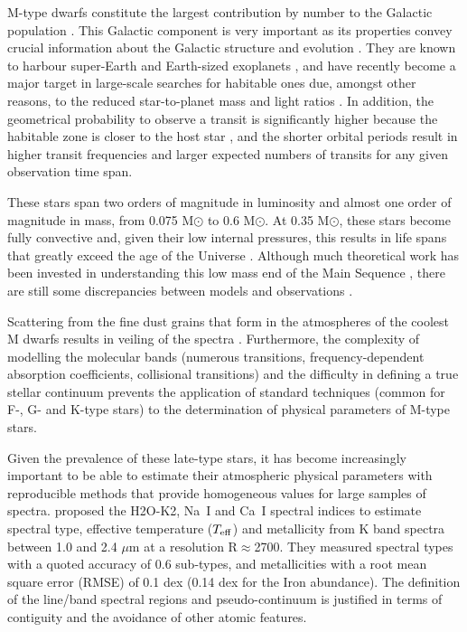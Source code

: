 
M-type dwarfs constitute the largest contribution by number to the
Galactic population \citep{2010AJ....139.2679B}. This Galactic
component is very important as its properties convey crucial
information about the Galactic structure and
evolution \citep{2013A&A...556A.110B}. They are known to harbour
super-Earth \citep{2013A&A...556A.110B} and Earth-sized
exoplanets \citep{2015ApJ...807...45D}, and have recently become a
major target in large-scale searches for habitable ones due, amongst
other reasons, to the reduced star-to-planet mass and light
ratios \citep{2015A&A...577A.128A}. In addition, the geometrical
probability to observe a transit is significantly higher because the
habitable zone is closer to the host star \citep{Shields20161}, and
the shorter orbital periods result in higher transit frequencies and
larger expected numbers of transits for any given observation time
span.

These stars span two orders of magnitude in luminosity and almost one
order of magnitude in mass, from 0.075 M$\odot$ to 0.6 M$\odot$. 
At 0.35 M$\odot$, these stars become fully convective and, given their
low internal pressures, this results in life spans that greatly exceed
the age of the Universe \citep{2005AN....326..913A}. Although much
theoretical work has been invested in understanding this low mass end
of the Main Sequence \citep{2008ApJ...676.1262B}, there are still some
discrepancies between models and observations \citep[see e.g.][for an
account of the observed inflated radii and cooler temperatures with
respect to model predictions]{2013AN....334....4T}.

Scattering from the fine dust grains that form in the atmospheres
of the coolest M dwarfs results in veiling of the
spectra \citep{2012EAS....57....3A}. Furthermore, the complexity of
modelling the molecular bands (numerous transitions,
frequency-dependent absorption coefficients, collisional transitions)
and the difficulty in defining a true stellar continuum prevents the
application of standard techniques (common for F-, G- and K-type
stars) to the determination of physical parameters of M-type stars.

Given the prevalence of these late-type stars, it has become
increasingly important to be able to estimate their atmospheric
physical parameters with reproducible methods that provide homogeneous
values for large samples of spectra. \cite{2012ApJ...748...93R}
proposed the H2O-K2, Na~{\sc I} and Ca~{\sc I} spectral indices to
estimate spectral type, effective temperature ($T_{\rm eff}$) and
metallicity from K band spectra between 1.0 and 2.4 $\mu$m at a
resolution R$\approx$2700. They measured spectral types with a quoted
accuracy of 0.6 sub-types, and metallicities with a root mean square
error (RMSE) of 0.1 dex (0.14 dex for the Iron abundance). The
definition of the line/band spectral regions and pseudo-continuum is
justified in terms of contiguity and the avoidance of other atomic
features. 

